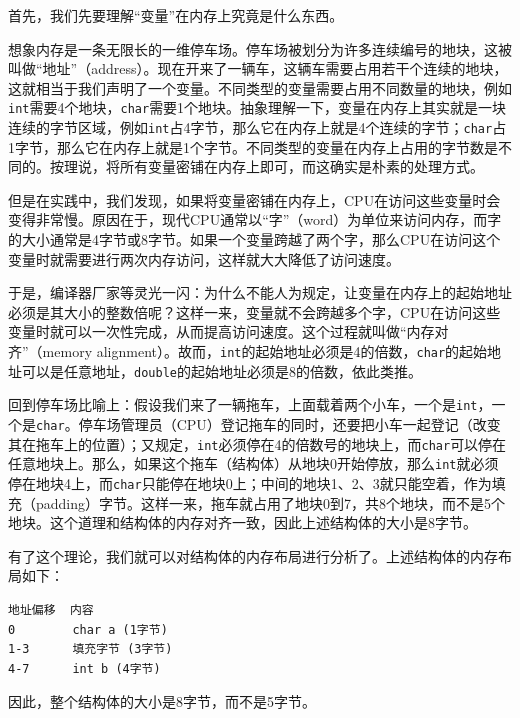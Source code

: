 首先，我们先要理解“变量”在内存上究竟是什么东西。

想象内存是一条无限长的一维停车场。停车场被划分为许多连续编号的地块，这被叫做“地址”（address）。现在开来了一辆车，这辆车需要占用若干个连续的地块，这就相当于我们声明了一个变量。不同类型的变量需要占用不同数量的地块，例如\verb|int|需要4个地块，\verb|char|需要1个地块。抽象理解一下，变量在内存上其实就是一块连续的字节区域，例如\verb|int|占4字节，那么它在内存上就是4个连续的字节；\verb|char|占1字节，那么它在内存上就是1个字节。不同类型的变量在内存上占用的字节数是不同的。按理说，将所有变量密铺在内存上即可，而这确实是朴素的处理方式。

但是在实践中，我们发现，如果将变量密铺在内存上，CPU在访问这些变量时会变得非常慢。原因在于，现代CPU通常以“字”（word）为单位来访问内存，而字的大小通常是4字节或8字节。如果一个变量跨越了两个字，那么CPU在访问这个变量时就需要进行两次内存访问，这样就大大降低了访问速度。

于是，编译器厂家等灵光一闪：为什么不能人为规定，让变量在内存上的起始地址必须是其大小的整数倍呢？这样一来，变量就不会跨越多个字，CPU在访问这些变量时就可以一次性完成，从而提高访问速度。这个过程就叫做“内存对齐”（memory alignment）。故而，\verb|int|的起始地址必须是4的倍数，\verb|char|的起始地址可以是任意地址，\verb|double|的起始地址必须是8的倍数，依此类推。

回到停车场比喻上：假设我们来了一辆拖车，上面载着两个小车，一个是\verb|int|，一个是\verb|char|。停车场管理员（CPU）登记拖车的同时，还要把小车一起登记（改变其在拖车上的位置）；又规定，\verb|int|必须停在4的倍数号的地块上，而\verb|char|可以停在任意地块上。那么，如果这个拖车（结构体）从地块0开始停放，那么\verb|int|就必须停在地块4上，而\verb|char|只能停在地块0上；中间的地块1、2、3就只能空着，作为填充（padding）字节。这样一来，拖车就占用了地块0到7，共8个地块，而不是5个地块。这个道理和结构体的内存对齐一致，因此上述结构体的大小是8字节。

有了这个理论，我们就可以对结构体的内存布局进行分析了。上述结构体的内存布局如下：
\begin{verbatim}
地址偏移  内容
0        char a (1字节)
1-3      填充字节 (3字节)
4-7      int b (4字节)
\end{verbatim}
因此，整个结构体的大小是8字节，而不是5字节。

